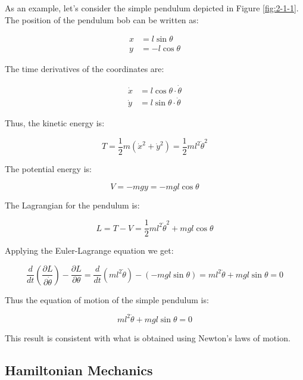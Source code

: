 As an example, let's consider the simple pendulum depicted in Figure \ref{fig:2-1-1}. 
The position of the pendulum bob can be written as:

\begin{align}
    x &= l \sin{\theta} \\
    y &= -l \cos{\theta} 
\end{align}

The time derivatives of the coordinates are:

\begin{align}
    \label{eq:2-12}
    \dot{x} &= l \cos{\theta} \cdot \dot{\theta} \\
    \label{eq:2-13}
    \dot{y} &= l \sin{\theta} \cdot \dot{\theta} 
\end{align}

Thus, the kinetic energy is:

\begin{equation}
    T=\frac{1}{2} m \left(\dot{x}^2+\dot{y}^2\right) = \frac{1}{2} ml^2\dot{\theta}^2
\end{equation}

The potential energy is:

\begin{equation}
    V=-mgy=-mgl\cos{\theta}
\end{equation}

The Lagrangian for the pendulum is:

\begin{equation}
    L=T-V=\frac{1}{2}ml^2\dot{\theta}^2+mgl\cos{\theta}
\end{equation}

Applying the Euler-Lagrange equation we get:

\begin{equation}
    \frac{d}{dt}\left(\frac{\partial L}{\partial\dot{\theta}}\right) - \frac{\partial L}{\partial\theta} = \frac{d}{dt}(ml^2\dot{\theta}) - (-mgl\sin{\theta})=ml^2\ddot{\theta}+mgl\sin{\theta}=0
\end{equation}

Thus the equation of motion of the simple pendulum is:

\begin{equation}
    \label{eq:2-18}
    ml^2\ddot{\theta} + mgl\sin{\theta} = 0
\end{equation}

This result is consistent with what is obtained using Newton's laws of motion.

\subsection{Hamiltonian Mechanics}

